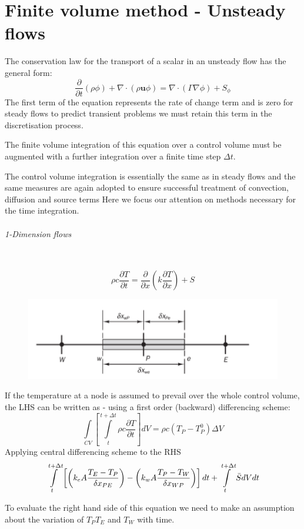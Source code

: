 \documentclass[a4paper, 15pt]{article}
\begin{document}
\part{Finite volume method - Unsteady flows}
The
conservation law for the transport of a scalar in an unsteady flow has the general form:
\[\dfrac{\partial}{\partial t}(\rho\phi) + \nabla\cdot(\rho \textbf{u}\phi) = \nabla\cdot(\Gamma\nabla\phi) + S_\phi\]
The
first term of the equation represents the rate of change term and is zero for steady flows to
predict transient problems we must retain this term in the discretisation process.

The
finite volume integration of this equation over a control volume must be augmented
with a further integration over a finite time step $\Delta t$. \newline 

The
control volume integration is essentially the same as in steady flows and the same measures
are again adopted to ensure successful treatment of convection, diffusion and source terms
Here
we focus our attention on methods necessary for the time integration. 

\paragraph*{1-Dimension flows} \mbox{} \\
\[\rho c\dfrac{\partial T}{\partial t} = \dfrac{\partial}{\partial x}\left(k\dfrac{\partial T}{\partial x}\right) + S\]
\begin{figure}[H]
	\centering
	\label{fig:screenshot026}
	\includegraphics[width=0.5\linewidth]{fig/screenshot026}
\end{figure}
If
the temperature at a node is assumed to prevail over the whole control volume, the LHS can be written as - using a first order (backward) differencing
scheme:
\[\int\limits_{CV} \left[\int\limits_{t}^{t+\Delta t}\rho c\dfrac{\partial T}{\partial t}\right]dV = \rho c(T_P-T_P^0)\Delta V\]
Applying central differencing scheme to the RHS
\[\int\limits_{t}^{t+\Delta t}\left[\left(k_eA\dfrac{T_E-T_P}{\delta x_{PE}}\right)- \left(k_wA\dfrac{T_P-T_W}{\delta x_{WP}}\right)\right]dt + \int\limits\limits_{t}^{t+\Delta t}\bar{S}dVdt\]

To
evaluate the right hand side of this equation we need to make an assumption about the
variation of $T_P T_E$ and $T_W$ with time. 
\end{document}
